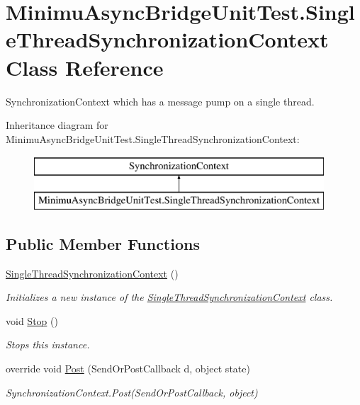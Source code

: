 \hypertarget{class_minimu_async_bridge_unit_test_1_1_single_thread_synchronization_context}{}\section{Minimu\+Async\+Bridge\+Unit\+Test.\+Single\+Thread\+Synchronization\+Context Class Reference}
\label{class_minimu_async_bridge_unit_test_1_1_single_thread_synchronization_context}


Synchronization\+Context which has a message pump on a single thread.  


Inheritance diagram for Minimu\+Async\+Bridge\+Unit\+Test.\+Single\+Thread\+Synchronization\+Context\+:\begin{figure}[H]
\begin{center}
\leavevmode
\includegraphics[height=2.000000cm]{class_minimu_async_bridge_unit_test_1_1_single_thread_synchronization_context}
\end{center}
\end{figure}
\subsection*{Public Member Functions}
\begin{DoxyCompactItemize}
\item 
\hyperlink{class_minimu_async_bridge_unit_test_1_1_single_thread_synchronization_context_aa3232bec413b52ace0ab6a088e554cd0}{Single\+Thread\+Synchronization\+Context} ()
\begin{DoxyCompactList}\small\item\em Initializes a new instance of the \hyperlink{class_minimu_async_bridge_unit_test_1_1_single_thread_synchronization_context}{Single\+Thread\+Synchronization\+Context} class. \end{DoxyCompactList}\item 
void \hyperlink{class_minimu_async_bridge_unit_test_1_1_single_thread_synchronization_context_af44938402ef26f6eba97b30101a857ff}{Stop} ()
\begin{DoxyCompactList}\small\item\em Stops this instance. \end{DoxyCompactList}\item 
override void \hyperlink{class_minimu_async_bridge_unit_test_1_1_single_thread_synchronization_context_a1c03a1c0f78415785d09881bcf103982}{Post} (Send\+Or\+Post\+Callback d, object state)
\begin{DoxyCompactList}\small\item\em Synchronization\+Context.\+Post(\+Send\+Or\+Post\+Callback, object) \end{DoxyCompactList}\end{DoxyCompactItemize}
